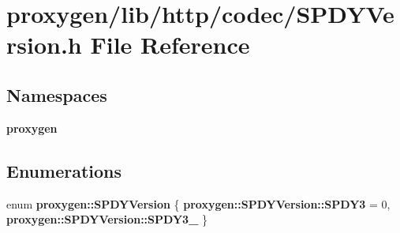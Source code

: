 \section{proxygen/lib/http/codec/\+S\+P\+D\+Y\+Version.h File Reference}
\label{SPDYVersion_8h}
\subsection*{Namespaces}
\begin{DoxyCompactItemize}
\item 
 {\bf proxygen}
\end{DoxyCompactItemize}
\subsection*{Enumerations}
\begin{DoxyCompactItemize}
\item 
enum {\bf proxygen\+::\+S\+P\+D\+Y\+Version} \{ {\bf proxygen\+::\+S\+P\+D\+Y\+Version\+::\+S\+P\+D\+Y3} = 0, 
{\bf proxygen\+::\+S\+P\+D\+Y\+Version\+::\+S\+P\+D\+Y3\+\_}
 \}
\end{DoxyCompactItemize}
